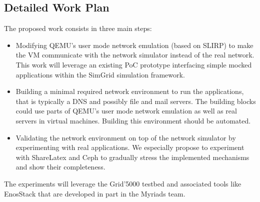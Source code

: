 \documentclass[a4paper,11pt]{article}
\begin{document}
\subsection*{Detailed Work Plan}

The proposed work consists in three main steps:
\begin{itemize}
\item Modifying QEMU's user mode network emulation (based on SLIRP) to
  make the VM communicate with the network simulator instead of the
  real network. This work will leverage an existing PoC prototype
  interfacing simple mocked applications within the SimGrid simulation
  framework.
\item Building a minimal required network environment to run the
  applications, that is typically a DNS and possibly file and mail
  servers. The building blocks could use parts of QEMU's user mode
  network emulation as well as real servers in virtual
  machines. Building this environment should be automated.
\item Validating the network environment on top of the network
  simulator by experimenting with real applications. We especially
  propose to experiment with ShareLatex and Ceph to gradually stress
  the implemented mechanisms and show their completeness.
\end{itemize}
The experiments will leverage the Grid'5000 testbed and associated
tools like EnosStack that are developed in part in the Myriads team.

%
\end{document}

